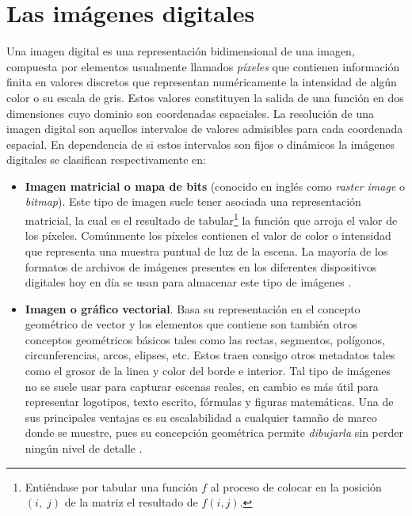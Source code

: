 \section{Las im\'agenes digitales}\label{sec:digital_images}
Una imagen digital \cite{solomon2011fundamentals,enwiki:di,eswiki:id} es una representaci\'on bidimensional de una imagen, compuesta por elementos usualmente llamados \textit{p\'ixeles} que contienen informaci\'on finita en valores discretos que representan num\'ericamente la intensidad de alg\'un color o su escala de gris. Estos valores constituyen la salida de una funci\'on en dos dimensiones cuyo dominio son coordenadas espaciales. La resolución de una imagen digital son aquellos intervalos de valores admisibles para cada coordenada espacial. En dependencia de si estos intervalos son fijos o din\'amicos la im\'agenes digitales se clasifican respectivamente en:
\begin{itemize}
	\item \textbf{Imagen matricial o mapa de bits} (conocido en ingl\'es como \textit{raster image} o \textit{bitmap}). Este tipo de imagen suele tener asociada una representaci\'on matricial, la cual es el resultado de tabular\footnote{Entiéndase por tabular una funci\'on $f$ al proceso de colocar en la posici\'on $(i,\;j)$ de la matriz el resultado de $f(i, j)$.} la funci\'on que arroja el valor de los p\'ixeles. Comúnmente los píxeles contienen el valor de color o intensidad que representa una muestra puntual de luz de la escena. La mayor\'ia de los formatos de archivos de im\'agenes presentes en los diferentes dispositivos digitales hoy en d\'ia se usan para almacenar este tipo de im\'agenes \cite{eswiki:imp}.
	\item \textbf{Imagen o gr\'afico vectorial}. Basa su representaci\'on en el concepto geom\'etrico de vector y los elementos que contiene son tambi\'en otros conceptos geom\'etricos b\'asicos tales como las rectas, segmentos, pol\'igonos, circunferencias, arcos, elipses, etc. Estos traen consigo otros metadatos tales como el grosor de la linea y color del borde e interior. Tal tipo de im\'agenes no se suele usar para capturar escenas reales, en cambio es m\'as \'util para representar logotipos, texto escrito, f\'ormulas y figuras matem\'aticas. Una de sus principales ventajas es su escalabilidad a cualquier tamaño de marco donde se muestre, pues su concepci\'on geom\'etrica permite \textit{dibujarla} sin perder ning\'un nivel de detalle \cite{eswiki:igv}.
\end{itemize}

